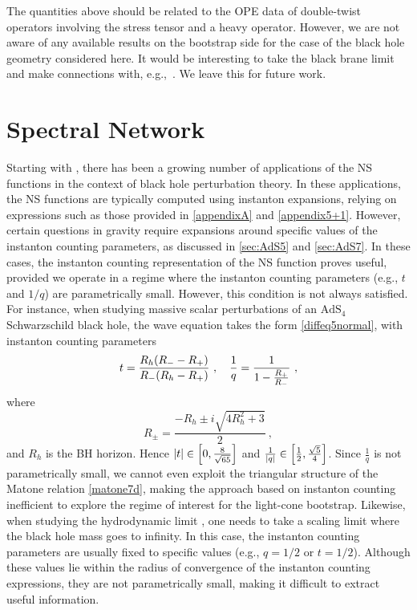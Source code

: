 \documentclass[11pt]{article}
\numberwithin{equation}{section}
\newcommand{\be}{\begin{equation}}
\newcommand{\ee}{\end{equation}}
\begin{document}
The quantities above should be related to the OPE data of double-twist operators involving the stress tensor and a heavy operator. However, we are not aware of any available results on the bootstrap side for the case of the black hole geometry considered here. It would be interesting to take the black brane limit and make connections with, e.g.,~\cite{Karlsson:2022osn}. We leave this for future work.

\section{Spectral Network}\label{sec:sn}

Starting with \cite{Aminov:2020yma}, there has been a growing number of applications of the NS functions in the context of black hole perturbation theory. In these applications, the NS functions are typically computed using instanton expansions, relying on expressions such as those provided in \autoref{appendixA} and \autoref{appendix5+1}. However, certain questions in gravity require expansions around specific values of the instanton counting parameters, as discussed in \autoref{sec:AdS5} and \autoref{sec:AdS7}. In these cases, the instanton counting representation of the NS function proves useful, provided we operate in a regime where the instanton counting parameters (e.g., $t$ and $1/q$) are parametrically small. However, this condition is not always satisfied.
For instance, when studying massive scalar perturbations of an $\mathrm{AdS}_4$ Schwarzschild black hole, the wave equation takes the form \eqref{diffeq5normal},  with instanton counting parameters
\be t=\frac{R_h (R_--R_+)}{R_- (R_h-R_+)}~,\quad
{1\over q}={1\over 1-\frac{R_+}{R_-}}~,\ee
where
\be R_{\pm}=\frac{-R_h\pm i\sqrt{4R_h^2+3}}{2}~,\ee
and $R_h$ is the BH horizon.  Hence $|t|\in \left[0 ,{8\over \sqrt{65}}\right]$ and ${1\over |q|}\in \left[{1 \over 2} , \frac{\sqrt{5}}{4}\right]$. 
Since $\frac{1}{q}$ is not parametrically small, we cannot even exploit the triangular structure of the Matone relation \eqref{matone7d}, making the approach based on instanton counting inefficient  to explore the regime of interest for the light-cone bootstrap.   Likewise, when studying the hydrodynamic limit \cite{Policastro:2002se}, one needs to take a scaling limit where the black hole mass goes to infinity. In this case, the instanton counting parameters are usually fixed to specific values (e.g., $q = 1/2$ or $t = 1/2$). Although these values lie within the radius of convergence of the instanton counting expressions, they are not parametrically small, making it difficult to extract useful information.
\end{document}
